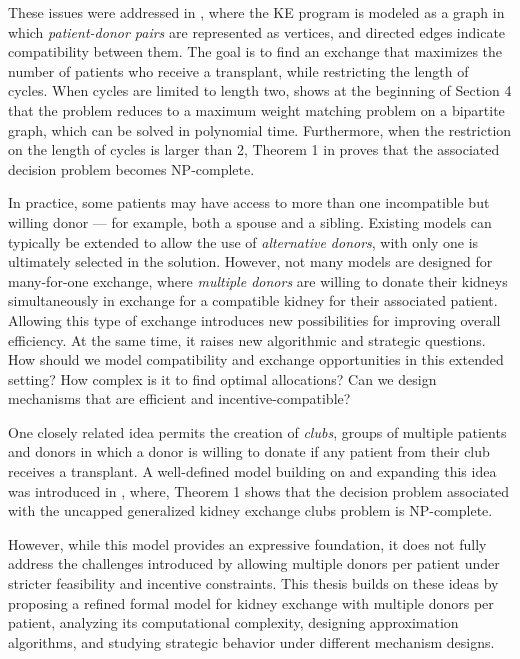 These issues were addressed in \cite{abraham2007clearing}, where the KE program is modeled as a graph in which \textit{patient-donor pairs} are represented as vertices, and directed edges indicate compatibility between them. The goal is to find an exchange that maximizes the number of patients who receive a transplant, while restricting the length of cycles. When cycles are limited to length two, \cite{abraham2007clearing} shows at the beginning of Section 4 that the problem reduces to a maximum weight matching problem on a bipartite graph, which can be solved in polynomial time. Furthermore, when the restriction on the length of cycles is larger than 2, Theorem 1 in \cite{abraham2007clearing} proves that the associated decision problem becomes NP-complete.

In practice, some patients may have access to more than one incompatible but willing donor — for example, both a spouse and a sibling. Existing models can typically be extended to allow the use of \textit{alternative donors}, with only one is ultimately selected in the solution. However, not many models are designed for many-for-one exchange, where \textit{multiple donors} are willing to donate their kidneys simultaneously in exchange for a compatible kidney for their associated patient. Allowing this type of exchange introduces new possibilities for improving overall efficiency. At the same time, it raises new algorithmic and strategic questions. How should we model compatibility and exchange opportunities in this extended setting? How complex is it to find optimal allocations? Can we design mechanisms that are efficient and incentive-compatible?

One closely related idea permits the creation of \textit{clubs}, groups of multiple patients and donors in which a donor is willing to donate if any patient from their club receives a transplant. A well-defined model building on and expanding this idea was introduced in \cite{farina2017operation}, where, Theorem 1 shows that the decision problem associated with the uncapped generalized kidney exchange clubs problem is NP-complete.

However, while this model provides an expressive foundation, it does not fully address the challenges introduced by allowing multiple donors per patient under stricter feasibility and incentive constraints. This thesis builds on these ideas by proposing a refined formal model for kidney exchange with multiple donors per patient, analyzing its computational complexity, designing approximation algorithms, and studying strategic behavior under different mechanism designs.

